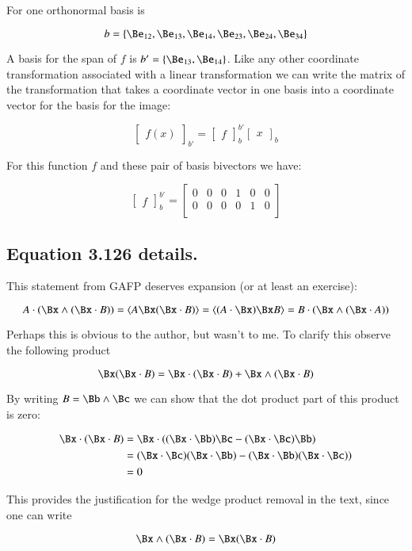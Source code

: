 \documentclass{article}      %
\newcommand{\matrixoftx}[3]{
{
\begin{bmatrix}
{#1}
\end{bmatrix}
}_{#2}^{#3}
}
\newcommand{\coordvec}[2]{
{
\begin{bmatrix}
{#1}
\end{bmatrix}
}_{#2}
}
\begin{document}
For  one orthonormal basis is

\[
b = \{ 
\Be_{12},
\Be_{13},
\Be_{14},
\Be_{23},
\Be_{24},
\Be_{34}
\}
\]

A basis for the span of $f$ is $b' = \{
\Be_{13},
\Be_{14}
\}$.  Like any other coordinate transformation associated with a linear transformation we can write the matrix of the transformation that
takes a coordinate vector in one basis into a coordinate vector for the basis for the image:

\[
\coordvec{f(x)}{b'}
=
\matrixoftx{f}{b}{b'}
\coordvec{x}{b}
\] 

For this function $f$ and these pair of basis bivectors we have:

\[
\matrixoftx{f}{b}{b'}
= 
\begin{bmatrix}
0 & 0 & 0 & 1 & 0 & 0 \\
0 & 0 & 0 & 0 & 1 & 0 \\
\end{bmatrix}
\]

\subsection{ Equation 3.126 details. }

This statement from GAFP deserves expansion (or at least an exercise):

\[
A \cdot ( \Bx \wedge (\Bx \cdot B) )
= \langle{A \Bx (\Bx \cdot B)}\rangle
= \langle (A \cdot \Bx) \Bx B \rangle
= B \cdot ( \Bx \wedge (\Bx \cdot A) )
\]

Perhaps this is obvious to the author, but wasn't to me.  To clarify this observe the following product

\[
\Bx ( \Bx \cdot B ) = \Bx \cdot ( \Bx \cdot B ) + \Bx \wedge ( \Bx \cdot B ) 
\]

By writing $B = \Bb \wedge \Bc$ we can show that the dot product part of this product is zero:

\begin{align*}
\Bx \cdot ( \Bx \cdot B ) 
&= \Bx \cdot ( (\Bx \cdot \Bb) \Bc - (\Bx \cdot \Bc) \Bb ) \\
&= (\Bx \cdot \Bc) (\Bx \cdot \Bb) - (\Bx \cdot \Bb) (\Bx \cdot \Bc)) \\
&= 0
\end{align*}

This provides the justification for the wedge product removal in the text, since
one can write

\begin{equation}
\Bx \wedge ( \Bx \cdot B ) = \Bx ( \Bx \cdot B )
\end{equation}\label{eqn:inertiaWedgeToProduct}
\end{document}
